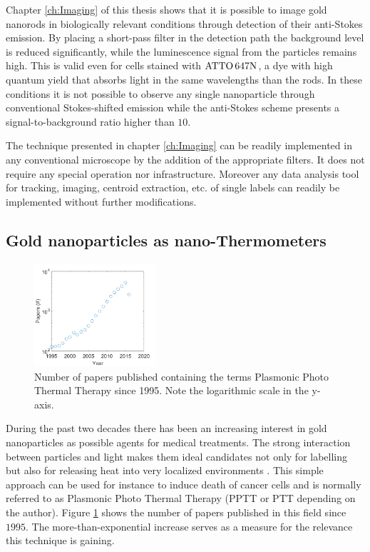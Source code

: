 Chapter \ref{ch:Imaging} of this thesis shows that it is possible to image gold
nanorods in biologically relevant conditions through detection of their
anti-Stokes emission. By placing a short-pass filter in the detection path the
background level is reduced significantly, while the luminescence signal from
the particles remains high. This is valid even for cells stained with $\textrm{ATTO}\,647\textrm{N}$, a
dye with high quantum yield that absorbs light in the same wavelengths than the
rods. In these conditions it is not possible to observe any single nanoparticle
through conventional Stokes-shifted emission while the anti-Stokes scheme
presents a signal-to-background ratio higher than $10$.

The technique presented in chapter \ref{ch:Imaging} can be readily implemented
in any conventional microscope by the addition of the appropriate filters. It
does not require any special operation nor infrastructure. Moreover any data
analysis tool for tracking, imaging, centroid extraction, etc. of single labels
can readily be implemented without further modifications.

\subsection{Gold nanoparticles as nano-Thermometers}
\begin{figure}[htp]
 \centering
 \includegraphics[width=0.40\textwidth]{Chapters/01_Introduction/Figures/paper_PT_therapy.png}
 \caption{Number of papers published containing the terms Plasmonic Photo
 Thermal Therapy since 1995. Note the logarithmic scale in the y-axis.}
 \label{fig:PPTT}
\end{figure}

During the past two decades there has been an increasing interest in gold
nanoparticles as possible agents for medical
treatments\cite{Gobin2007,Huang2006,Huo2014}. The strong interaction between
particles and light makes them ideal candidates not only for labelling but also
for releasing heat into very localized environments
\cite{Huang2008,Huang2006,Gobin2007,Hirsch2003}.
This simple approach can be used for instance to induce death of cancer cells
and is normally referred to as Plasmonic Photo Thermal Therapy (PPTT or PTT
depending on the author). Figure \ref{fig:PPTT} shows the number of papers
published in this field since $1995$. The more-than-exponential increase serves
as a measure for the relevance this technique is gaining.

